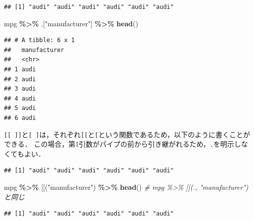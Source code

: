 \documentclass[
]{article}
\newenvironment{Shaded}{\begin{snugshade}}{\end{snugshade}}
\newcommand{\AttributeTok}[1]{\textcolor[rgb]{0.13,0.29,0.53}{#1}}
\newcommand{\CommentTok}[1]{\textcolor[rgb]{0.56,0.35,0.01}{\textit{#1}}}
\newcommand{\FunctionTok}[1]{\textcolor[rgb]{0.13,0.29,0.53}{\textbf{#1}}}
\newcommand{\NormalTok}[1]{#1}
\newcommand{\SpecialCharTok}[1]{\textcolor[rgb]{0.81,0.36,0.00}{\textbf{#1}}}
\newcommand{\StringTok}[1]{\textcolor[rgb]{0.31,0.60,0.02}{#1}}
\begin{document}
\begin{verbatim}
## [1] "audi" "audi" "audi" "audi" "audi" "audi"
\end{verbatim}

\begin{Shaded}
\begin{Highlighting}[]
\NormalTok{mpg }\SpecialCharTok{\%\textgreater{}\%}\NormalTok{ .[}\StringTok{"manufacturer"}\NormalTok{]   }\SpecialCharTok{\%\textgreater{}\%} \FunctionTok{head}\NormalTok{()}
\end{Highlighting}
\end{Shaded}

\begin{verbatim}
## # A tibble: 6 x 1
##   manufacturer
##   <chr>       
## 1 audi        
## 2 audi        
## 3 audi        
## 4 audi        
## 5 audi        
## 6 audi
\end{verbatim}

\texttt{{[}{[}\ {]}{]}}と\texttt{{[}\ {]}}は，それぞれ\texttt{{[}{[}}と\texttt{{[}}という関数であるため，以下のように書くことができる．
この場合，第1引数がパイプの前から引き継がれるため，\texttt{.}を明示しなくてもよい．

\begin{Shaded}
\end{Shaded}

\begin{verbatim}
## [1] "audi" "audi" "audi" "audi" "audi" "audi"
\end{verbatim}

\begin{Shaded}
\begin{Highlighting}[]
\NormalTok{mpg }\SpecialCharTok{\%\textgreater{}\%} \StringTok{\textasciigrave{}}\AttributeTok{[[}\StringTok{\textasciigrave{}}\NormalTok{(}\StringTok{"manufacturer"}\NormalTok{) }\SpecialCharTok{\%\textgreater{}\%} \FunctionTok{head}\NormalTok{() }\CommentTok{\# mpg \%\textgreater{}\% \textasciigrave{}[[\textasciigrave{}(., "manufacturer") と同じ}
\end{Highlighting}
\end{Shaded}

\begin{verbatim}
## [1] "audi" "audi" "audi" "audi" "audi" "audi"
\end{verbatim}
\end{document}
